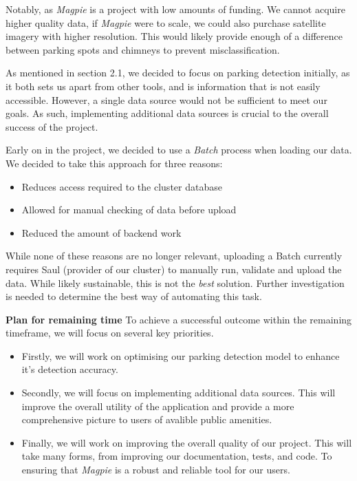 \noindent{}Notably, as \textit{Magpie} is a project with low amounts of funding.
We cannot acquire higher quality data, if \textit{Magpie} were to scale, we
could also purchase satellite imagery with higher resolution. This would likely
provide enough of a difference between parking spots and chimneys to prevent
misclassification.

\noindent{}As mentioned in section 2.1, we decided to focus on parking detection
initially, as it both sets us apart from other tools, and is information that is
not easily accessible. However, a single data source would not be sufficient to meet
our goals. As such, implementing additional data sources is crucial to the overall
success of the project.

\noindent{}Early on in the project, we decided to use a \textit{Batch} process
when loading our data. We decided to take this approach for three reasons:
\vspace{-3mm}
\begin{itemize}
  \item{Reduces access required to the cluster database}
  \item{Allowed for manual checking of data before upload}
  \item{Reduced the amount of backend work}
\end{itemize}
\vspace{-3mm}

\noindent{}While none of these reasons are no longer relevant, uploading a Batch
currently requires Saul (provider of our cluster) to manually run, validate and
upload the data. While likely sustainable, this is not the \textit{best}
solution. Further investigation is needed to determine the best way of
automating this task.

\noindent{}\textbf{Plan for remaining time} To achieve a successful outcome
within the remaining timeframe, we will focus on several key priorities. 
\begin{itemize}
    \item{Firstly, we will work on optimising our parking detection model to
    enhance it's detection accuracy.}
    \\

    \item{Secondly, we will focus on implementing additional data sources. This
    will improve the overall utility of the application and provide a more
    comprehensive picture to users of avalible public amenities.}
    \\

    \item{Finally, we will work on improving the overall quality of our project.
    This will take many forms, from improving our documentation, tests, and
    code. To ensuring that \textit{Magpie} is a robust and reliable tool for our
    users.}
    \\
\end{itemize}
\vspace{-3mm}

